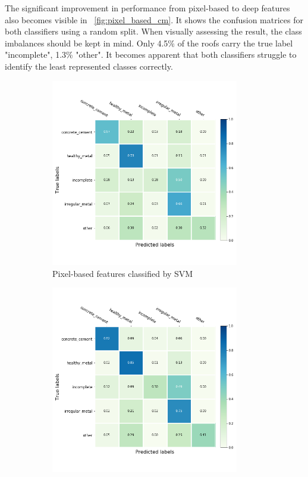 \documentclass[11pt]{article}
\begin{document}
	The significant improvement in performance from pixel-based to deep features also becomes visible in ~\ref{fig:pixel_based_cm}. It shows the confusion matrices for both classifiers using a random split. When visually assessing the result, the class imbalances should be kept in mind. Only 4.5\% of the roofs carry the true label "incomplete", 1.3\% "other". It becomes apparent that both classifiers struggle to identify the least represented classes correctly.
	
	\begin{figure}
		\begin{subfigure}[t]{.5\textwidth}
			\centering
			\includegraphics[width=0.9\textwidth]{figures/results/pixel_based_cm.png}
			\caption{Pixel-based features classified by SVM}
		\end{subfigure}
		\begin{subfigure}[t]{.5\textwidth}
			\centering
			\includegraphics[width=0.9\textwidth]{figures/results/nn_based_cm_svm.png}

\end{subfigure}
\end{figure}
\end{document}
